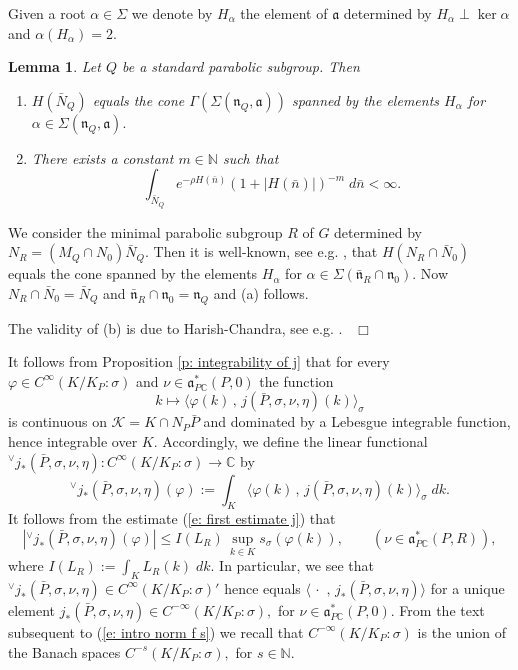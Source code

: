\documentclass[12pt,a4paper]{article}
\newtheorem{Lemma}[Thm]{Lemma}
\newenvironment{lemma}[0]{\begin{Lemma}\noindent}%
{\end{Lemma}}
\def\proof{\par\noindent{\it Proof.}{\ }{\ }}
\def\qed{~\hfill\hbox{$\Box$}\medbreak}
\def\qquad{\quad\quad}
\def\itema{\vspace{-1mm}\item[{\rm (a)}]}
\def\itemb{\item[{\rm (b)}]}
\def\msy#1{{\mathbb #1}}
\def\C{{\msy C}}
\def\N{{\msy N}}
\def\ga{\alpha}
\def\gf{\varphi}
\def\gs{\sigma}
\def\gS{\Sigma}
\def\got#1{\mathfrak #1}
\def\fa{{\got a}}
\def\fn{{\got n}}
\def\to{\rightarrow}
\def\inp#1#2{\langle#1\,,\,#2\rangle}
\def\iC{{\scriptscriptstyle \C}}
\def\cK{{\mathcal K}}
\numberwithin{Thm}{section}
\numberwithin{equation}{section}
\def\dotvar{\, \cdot\,}
\def\faPdc{{\fa_{P\iC}^*}}
\numberwithin{equation}{section}
\def\faPdc{\fa_{P\iC}^*}
\def\gsP{\gs}%
\def\veec{\vee}%
\def\trw{{}^{\scriptscriptstyle\veec}}
\begin{document}
Given a root $\ga\in \gS$ we denote by $H_\ga$ the element of $\fa$ determined by 
$H_\ga \perp \ker \ga$ and $\ga(H_\ga) = 2.$
\begin{lemma}
\label{l: image N Q under H}
Let $Q$ be a standard parabolic subgroup. Then 
\begin{enumerate}
\itema
$H(\bar N_Q)$ 
equals the cone $\Gamma(\gS( \fn_Q, \fa))$ spanned by the elements $H_\ga$ for $\ga \in 
\gS(\fn_Q, \fa).$ 
\itemb
There exists a constant $m \in \N$ such that
$$ 
\int_{\bar N_Q} e^{-\rho H(\bar n)} (1 + |H(\bar n)|)^{-m} \; d\bar n < \infty.
$$%
\end{enumerate}
\end{lemma}

\proof
We consider the minimal parabolic subgroup $R$ of $G$ determined by 
$
N_{R} = (M_Q\cap N_0) \bar N_Q .$ 
Then it is well-known, see e.g. \cite[Lemma 4.9]{BBconv}, that
$
H(N_R \cap \bar N_0) 
$ 
equals the cone spanned by the elements $H_\ga$ for $\ga \in \gS(\bar \fn_R \cap \fn_0).$ 
Now $N_R \cap \bar N_0 = \bar N_Q$ and $\bar \fn_R \cap \fn_0 = \fn_Q$ and (a) follows.

The validity of  (b) is due to Harish-Chandra, see e.g. \cite[\S 31]{HC_HA1}.
\qed

It follows from Proposition \ref{p: integrability of j}
that for every $\gf \in C^\infty(K/ K_P:\gsP)$ and $\nu \in \faPdc(P,0)$ 
the function
$$ 
k \mapsto \inp{\gf(k)}{j(\bar P, \gs, \nu, \eta )(k)}_\gs 
$$%
is continuous on $\cK = K \cap N_P\bar P$ and dominated by a Lebesgue integrable function, hence integrable over $K.$ 
Accordingly, we define the linear functional $\trw\!j_*(\bar P, \gs, \nu, \eta): 
%
C^\infty(K/K_P:\gsP) \to \C$ by
%
\begin{equation}
\label{e: definition j star}
\trw\!j_*(\bar P,  \gs, \nu,\eta)(\gf):= \int_K \inp{\gf(k)}{j(\bar P, \gs, \nu, \eta )(k)}_\gs\; dk.
\end{equation}
It follows from the estimate (\ref{e: first estimate j}) that
\begin{equation}
\label{e: continuity estimate j}
|\trw\!j_*(\bar P,  \gs, \nu, \eta )(\gf)| \leq  I(L_R) \,  \sup_{k \in K} s_\gs(\gf(k)), \qquad (\nu \in \faPdc(P,R)),
\end{equation}
where $I(L_R):= \int_K L_R(k)\; dk.$
In particular, we see that $\trw\!j_*(\bar P, \gs, \nu,\eta) \in C^\infty(K/K_P:\gsP)'$ 
hence equals $\inp{\dotvar}{j_*(\bar P, \gs, \nu,\eta)}$ for a unique element
$j_*(\bar P, \gs, \nu,\eta) \in C^{-\infty}(K/K_P:\gsP), $ 
for 
$\nu \in \faPdc(P,0).$ From the text subsequent to (\ref{e:  intro norm f s}) we recall 
that $C^{-\infty}(K/K_P:\gsP)$ is the union of the Banach spaces $C^{-s}(K/K_P:\gsP),$ for 
$s\in \N.$ 
\end{document}

